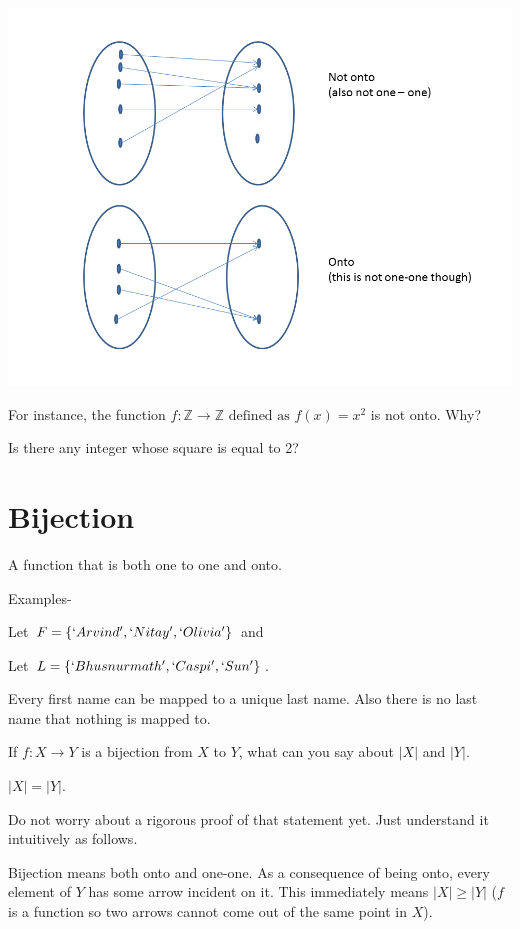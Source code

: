 \documentclass[12pt]{article}
\begin{document}
\includegraphics[scale=0.7]{./img/Onto.png}

\vspace{0.5in}

For instance, the function $f: \mathbb{Z} \rightarrow \mathbb{Z} \text{ defined as } f(x) = x^2$ is not onto.
Why?

Is there any integer whose square is equal to 2? 


\section*{Bijection}

A function that is both one to one and onto. 

Examples- 

Let $F = \{`Arvind', `Nitay', `Olivia'\}$ and 

Let $L = \{`Bhusnurmath', `Caspi', `Sun'\}$.

Every first name can be mapped to a unique last name. Also there is no last name that nothing is mapped to.

\medskip

If $f: X \rightarrow Y$ is a bijection from $X$ to $Y$, what can you say about $|X|$ and $|Y|$.

$|X| = |Y|$.


Do not worry about a rigorous proof of that statement yet. Just understand it intuitively as follows. 


Bijection means both onto and one-one. As a consequence of being onto, every element of $Y$ has some arrow incident on it. This immediately means $|X| \ge |Y|$ ($f$ is a function so two arrows cannot come out of the same point in $X$).
\end{document}
